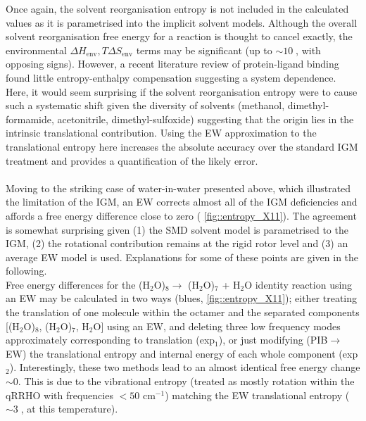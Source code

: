 \documentclass[../main.tex]{subfiles}
\begin{document}
Once again, the solvent reorganisation entropy is not included in the calculated values as it is parametrised into the implicit solvent models. Although the overall solvent reorganisation free energy for a reaction is thought to cancel exactly, the environmental $\Delta H_\text{env}, T\Delta S_\text{env}$ terms may be significant (up to $\sim 10\;$\kcal, with opposing signs).\cite{Grunwald1995}
However, a recent literature review of protein-ligand binding found little entropy-enthalpy compensation suggesting a system dependence.\cite{Chodera2013} Here, it would seem surprising if the solvent reorganisation entropy were to cause such a systematic shift given the diversity of solvents (methanol, dimethyl-formamide, acetonitrile, dimethyl-sulfoxide) suggesting that the origin lies in the intrinsic translational contribution. Using the EW approximation to the translational entropy here increases the absolute accuracy over the standard IGM treatment and provides a quantification of the likely error. 
\\\\
Moving to the striking case of water-in-water presented above, which illustrated the limitation of the IGM, an EW corrects almost all of the IGM deficiencies and affords a free energy difference close to zero (\figurename{ \ref{fig::entropy_X11}}). The agreement is somewhat surprising given (1) the SMD solvent model is parametrised to the IGM, (2) the rotational contribution remains at the rigid rotor level and (3) an average EW model is used. Explanations for some of these points are given in the following.
\\
Free energy differences for the (H$_2$O)$_8 \longrightarrow$ (H$_2$O)$_7$ +  H$_2$O identity reaction using an EW may be calculated in two ways (blues, \figurename{ \ref{fig::entropy_X11}}); either treating the translation of one molecule within the octamer and the separated components [(H$_2$O)$_8$, (H$_2$O)$_7$, H$_2$O] using an EW,  and deleting three low frequency modes approximately corresponding to translation (exp$_1$), or just modifying (PIB$\rightarrow$EW) the translational entropy and internal energy of each whole component  (exp$_2$). Interestingly, these two methods lead to an almost identical free energy change $\sim 0$. This is due to the vibrational entropy (treated as mostly rotation within the qRRHO with frequencies $< 50$ cm$^{-1}$) matching the EW translational entropy ($\sim 3\;$\kcal, at this temperature). 
\vspace{0.4cm}
\end{document}
